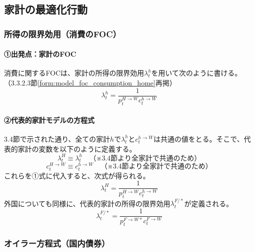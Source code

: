 \subsection{家計の最適化行動}
\label{sec:model_final_equations_utility}
\subsubsection{所得の限界効用（消費のFOC）}
\label{sec:model_final_equations_utility_lambda}
\paragraph{①出発点：家計のFOC}\label{sec:model_final_equations_utility_lambda_origin}
消費に関するFOCは、家計の所得の限界効用\(\lambda_t^h\)を用いて次のように書ける。（3.3.2.3節\eqref{form:model_foc_consumption_home}再掲）
\begin{equation}
\lambda_t^h=\frac{1}{p_t^{H\to W}c_t^{h\to W}}
\label{form:model_final_equations_utility_foc_restated}
\end{equation}

\paragraph{②代表的家計モデルの方程式}\label{sec:model_final_equations_utility_lambda_ra_eq}
3.4節で示された通り、全ての家計\(h\)で\(\lambda_t^h\)と\(c_t^{h\to W}\)は共通の値をとる。そこで、代表的家計の変数を以下のように定義する。
\begin{equation}
\lambda_t^H\equiv\lambda_t^h\quad（※3.4節より全家計で共通のため）
\label{form:model_final_equations_utility_lambda_h_def}
\end{equation}
\begin{equation}
c_t^{H\to W}\equiv c_t^{h\to W}\quad（※3.4節より全家計で共通のため）
\label{form:model_final_equations_utility_consumption_w_def}
\end{equation}
これらを①式に代入すると、次式が得られる。
\begin{equation}
\lambda_t^H=\frac{1}{p_t^{H\to W}c_t^{h\to W}}
\label{form:model_final_equations_utility_lambda_h}
\end{equation}
外国についても同様に、代表的家計の所得の限界効用\(\lambda_t^{F/*}\)が定義される。
\begin{equation}
\lambda_t^{F/*}=\frac{1}{p_t^{F\to W*}c_t^{F\to W}}
\label{form:model_final_equations_utility_lambda_f}
\end{equation}

\subsubsection{オイラー方程式（国内債券）}
\label{sec:model_final_equations_utility_euler}
